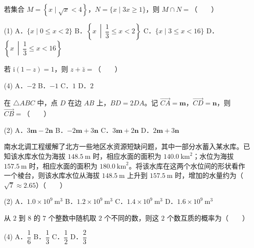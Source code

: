 \begin{question}
若集合 $M=\left\{x\mid\sqrt x<4\right\}$，$N=\{x\mid3x\ge1\}$，则 $M\cap N=$\mbox{（　　）}

\begin{gkopts}(1)
\task A．$\{x\mid0\le x<2\}$
\task B．$\left\{x\ \middle|\ \dfrac13\le x<2\right\}$
\task C．$\{x\mid3\le x<16\}$
\task D．$\left\{x\ \middle|\ \dfrac13\le x<16\right\}$
\end{gkopts}

\end{question}
\begin{question}
若 $\mathrm i(1-z)=1$，则 $z+\bar z=$\mbox{（　　）}

\begin{gkopts}(4)
\task A．$-2$
\task B．$-1$
\task C．$1$
\task D．$2$
\end{gkopts}

\end{question}
\begin{question}
在 $\triangle ABC$ 中，点 $D$ 在边 $AB$ 上，$BD=2DA$。记 $\overrightarrow{CA}=\boldsymbol m$，$\overrightarrow{CD}=\boldsymbol n$，则 $\overrightarrow{CB}=$\mbox{（　　）}

\begin{gkopts}(2)
\task A．$3\boldsymbol m-2\boldsymbol n$
\task B．$-2\boldsymbol m+3\boldsymbol n$
\task C．$3\boldsymbol m+2\boldsymbol n$
\task D．$2\boldsymbol m+3\boldsymbol n$
\end{gkopts}

\end{question}
\begin{question}
南水北调工程缓解了北方一些地区水资源短缺问题，其中一部分水蓄入某水库。已知该水库水位为海拔 $148.5\ \mathrm m$ 时，相应水面的面积为 $140.0\ \mathrm{km}^{2}$；水位为海拔 $157.5\ \mathrm m$ 时，相应水面的面积为 $180.0\ \mathrm{km}^{2}$。将该水库在这两个水位间的形状看作一个棱台，则该水库水位从海拔 $148.5\ \mathrm m$ 上升到 $157.5\ \mathrm m$ 时，增加的水量约为（$\sqrt7\approx2.65$）\mbox{（　　）}

\begin{gkopts}(2)
\task A．$1.0\times10^{9}\ \mathrm m^{3}$
\task B．$1.2\times10^{9}\ \mathrm m^{3}$
\task C．$1.4\times10^{9}\ \mathrm m^{3}$
\task D．$1.6\times10^{9}\ \mathrm m^{3}$
\end{gkopts}

\end{question}
\begin{question}
从 $2$ 到 $8$ 的 $7$ 个整数中随机取 $2$ 个不同的数，则这 $2$ 个数互质的概率为\mbox{（　　）}

\begin{gkopts}(4)
\task A．$\dfrac16$
\task B．$\dfrac13$
\task C．$\dfrac12$
\task D．$\dfrac23$
\end{gkopts}

\end{question}
